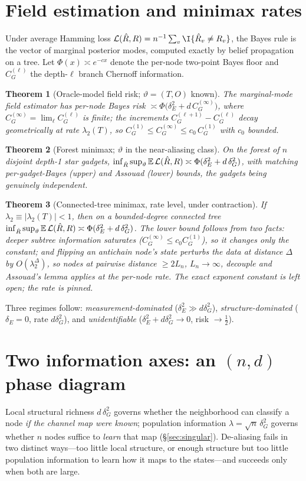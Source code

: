 \documentclass[11pt]{article}
\theoremstyle{plain}
\newtheorem{theorem}{Theorem}\newtheorem{proposition}{Proposition}\newtheorem{corollary}{Corollary}
\theoremstyle{definition}\newtheorem{definition}{Definition}\newtheorem{assumption}{Assumption}
\begin{document}
\section{Field estimation and minimax rates}\label{sec:field}
Under average Hamming loss $\mathcal L(\hat R,R)=n^{-1}\sum_v\I\{\hat R_v\neq R_v\}$, the Bayes rule is the vector
of marginal posterior modes, computed exactly by belief propagation on a tree. Let $\Phi(x)\asymp e^{-cx}$ denote
the per-node two-point Bayes floor and $C_G^{(\ell)}$ the depth-$\ell$ branch Chernoff information.
\begin{theorem}[Oracle-model field risk; $\vartheta=(T,O)$ known]\label{thm:oracle}
The marginal-mode field estimator has per-node Bayes risk $\asymp\Phi\big(\delta_E^2+d\,C_G^{(\infty)}\big)$, where
$C_G^{(\infty)}=\lim_\ell C_G^{(\ell)}$ is finite; the increments $C_G^{(\ell+1)}-C_G^{(\ell)}$ decay geometrically
at rate $\lambda_2(T)$, so $C_G^{(1)}\le C_G^{(\infty)}\le c_0\,C_G^{(1)}$ with $c_0$ bounded.
\end{theorem}
\begin{theorem}[Forest minimax; $\vartheta$ in the near-aliasing class]\label{thm:forest}
On the forest of $n$ disjoint depth-1 star gadgets, $\inf_{\hat R}\sup_\vartheta\mathbb{E}\,\mathcal L(\hat R,R)\asymp
\Phi(\delta_E^2+d\,\delta_G^2)$, with matching per-gadget-Bayes (upper) and Assouad (lower) bounds, the gadgets
being genuinely independent.
\end{theorem}
\begin{theorem}[Connected-tree minimax, rate level, under contraction]\label{thm:connected}
If $\lambda_2\equiv|\lambda_2(T)|<1$, then on a bounded-degree connected tree
$\inf_{\hat R}\sup_\vartheta\mathbb{E}\,\mathcal L(\hat R,R)\asymp\Phi(\delta_E^2+d\,\delta_G^2)$. The lower bound follows
from two facts: deeper subtree information \emph{saturates} ($C_G^{(\infty)}\le c_0 C_G^{(1)}$), so it changes only
the constant; and flipping an antichain node's state perturbs the data at distance $\Delta$ by $O(\lambda_2^\Delta)$,
so nodes at pairwise distance $\ge 2L_n$, $L_n\to\infty$, \emph{decouple} and Assouad's lemma applies at the
per-node rate. The exact exponent constant is left open; the rate is pinned.
\end{theorem}
\noindent Three regimes follow: \emph{measurement-dominated} ($\delta_E^2\gg d\delta_G^2$),
\emph{structure-dominated} ($\delta_E=0$, rate $d\delta_G^2$), and \emph{unidentifiable}
($\delta_E^2+d\delta_G^2\to0$, risk $\to\tfrac12$).

\section{Two information axes: an $(n,d)$ phase diagram}\label{sec:phase}
Local structural richness $d\,\delta_G^2$ governs whether the neighborhood can classify a node \emph{if the
channel map were known}; population information $\lambda=\sqrt n\,\delta_G^2$ governs whether $n$ nodes suffice to
\emph{learn} that map (\S\ref{sec:singular}). De-aliasing fails in two distinct ways---too little local structure,
or enough structure but too little population information to learn how it maps to the states---and succeeds only
when both are large.
\end{document}
